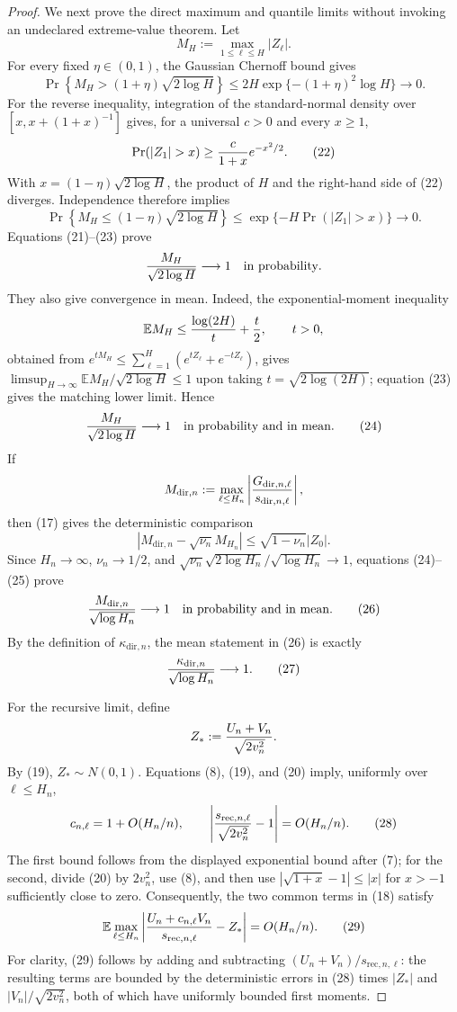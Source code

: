 \documentclass{article}
\begin{document}
\begin{proof}
We next prove the direct maximum and quantile limits without invoking an undeclared extreme-value theorem.  Let
\[
 M_H:=\max_{1\leq\ell\leq H}|Z_\ell|.
\]
For every fixed \(\eta\in(0,1)\), the Gaussian Chernoff bound gives
\[
 \Pr\!\left\{M_H>(1+\eta)\sqrt{2\log H}\right\}
 \leq2H\exp\{- (1+\eta)^2\log H\}\longrightarrow0.
 \tag{21}
\]
For the reverse inequality, integration of the standard-normal density over
\([x,x+(1+x)^{-1}]\) gives, for a universal \(c>0\) and every \(x\geq1\),
\[
 \Pr(|Z_1|>x)\geq {c\over1+x}e^{-x^2/2}.
 \tag{22}
\]
With \(x=(1-\eta)\sqrt{2\log H}\), the product of \(H\) and the right-hand side of (22) diverges.  Independence therefore implies
\[
 \Pr\!\left\{M_H\leq(1-\eta)\sqrt{2\log H}\right\}
 \leq\exp\{-H\Pr(|Z_1|>x)\}\longrightarrow0.
 \tag{23}
\]
Equations (21)--(23) prove
\[
 {M_H\over\sqrt{2\log H}}\longrightarrow1
 \quad\hbox{in probability}.
\]
They also give convergence in mean.  Indeed, the exponential-moment inequality
\[
 \mathbb E M_H\leq {\log(2H)\over t}+{t\over2},
 \qquad t>0,
\]
obtained from \(e^{tM_H}\leq\sum_{\ell=1}^H(e^{tZ_\ell}+e^{-tZ_\ell})\), gives
\(\limsup_{H\to\infty}\mathbb E M_H/\sqrt{2\log H}\leq1\) upon taking \(t=\sqrt{2\log(2H)}\); equation (23) gives the matching lower limit.  Hence
\[
 {M_H\over\sqrt{2\log H}}\longrightarrow1
 \quad\hbox{in probability and in mean}.
 \tag{24}
\]
If
\[
 M_{\mathrm{dir},n}:=\max_{\ell\leq H_n}
 \left|{G_{\mathrm{dir},n,\ell}\over s_{\mathrm{dir},n,\ell}}\right|,
\]
then (17) gives the deterministic comparison
\[
 \left|M_{\mathrm{dir},n}-\sqrt{\nu_n}M_{H_n}\right|
 \leq\sqrt{1-\nu_n}|Z_0|.
 \tag{25}
\]
Since \(H_n\to\infty\), \(\nu_n\to1/2\), and
\(\sqrt{\nu_n}\sqrt{2\log H_n}/\sqrt{\log H_n}\to1\), equations (24)--(25) prove
\[
 {M_{\mathrm{dir},n}\over\sqrt{\log H_n}}\longrightarrow1
 \quad\hbox{in probability and in mean}.
 \tag{26}
\]
By the definition of \(\kappa_{\mathrm{dir},n}\), the mean statement in (26) is exactly
\[
 {\kappa_{\mathrm{dir},n}\over\sqrt{\log H_n}}\longrightarrow1.
 \tag{27}
\]

For the recursive limit, define
\[
 Z_*:={U_n+V_n\over\sqrt{2v_n^2}}.
\]
By (19), \(Z_*\sim N(0,1)\).  Equations (8), (19), and (20) imply, uniformly over \(\ell\leq H_n\),
\[
 c_{n,\ell}=1+O(H_n/n),
 \qquad
 \left|{s_{\mathrm{rec},n,\ell}\over\sqrt{2v_n^2}}-1\right|
 =O(H_n/n).
 \tag{28}
\]
The first bound follows from the displayed exponential bound after (7); for the second, divide (20) by \(2v_n^2\), use (8), and then use
\(|\sqrt{1+x}-1|\leq |x|\) for \(x>-1\) sufficiently close to zero.  Consequently, the two common terms in (18) satisfy
\[
 \mathbb E\max_{\ell\leq H_n}
 \left|{U_n+c_{n,\ell}V_n\over s_{\mathrm{rec},n,\ell}}-Z_*\right|
 =O(H_n/n).
 \tag{29}
\]
For clarity, (29) follows by adding and subtracting \((U_n+V_n)/s_{\mathrm{rec},n,\ell}\): the resulting terms are bounded by the deterministic errors in (28) times \(|Z_*|\) and \(|V_n|/\sqrt{2v_n^2}\), both of which have uniformly bounded first moments.


\end{proof}
\end{document}
